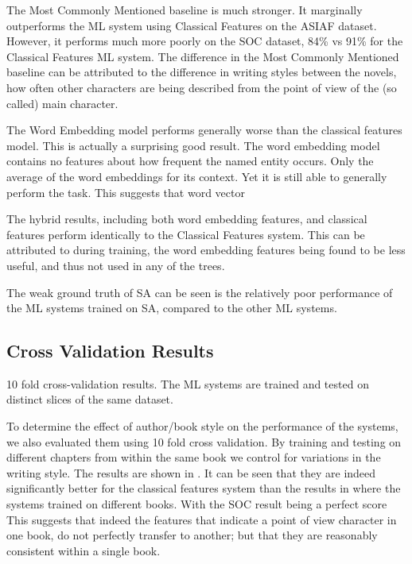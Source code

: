 \documentclass[11pt,a4paper]{article}
\begin{document}
The Most Commonly Mentioned baseline is much stronger.
It marginally outperforms the ML system using Classical Features on the ASIAF dataset.
However, it performs much more poorly on the SOC dataset, 84\% vs 91\% for the Classical Features ML system.
The difference in the Most Commonly Mentioned baseline can be attributed to the difference in writing styles between the novels, how often other characters are being described from the point of view of the (so called) main character.

The Word Embedding model performs generally worse than the classical features model.
This is actually a surprising good result.
The word embedding model contains no features about how frequent the named entity occurs.
Only the average of the word embeddings for its context.
Yet it is still able to generally perform the task.
This suggests that word vector 

The hybrid results, including both word embedding features, and classical features perform identically to the Classical Features system.
This can be attributed to during training, the word embedding features being found to be less useful, and thus not used in any of the trees.

The weak ground truth of SA can be seen is the relatively poor performance of the ML systems trained on SA, compared to the other ML systems.



\subsection{Cross Validation Results}

\begin{table*}
	\begin{adjustbox}{max width=\textwidth}
	\end{adjustbox}
	
	\caption{10 fold cross-validation results. The ML systems are trained and tested on distinct slices of the same dataset. \label{tbl:rescross}}
\end{table*}

To determine the effect of author/book style on the performance of the systems,
we also evaluated them using 10 fold cross validation.
By training and testing on different chapters from within the same book we control for variations in the writing style.
The results are shown in  .
It can be seen that they are indeed significantly better for the classical features system than the results in  where the systems trained on different books.
With the SOC result being a perfect score
This suggests that indeed the features that indicate a point of view character in one book, do not perfectly transfer to another; but that they are reasonably consistent within a single book.
\end{document}
